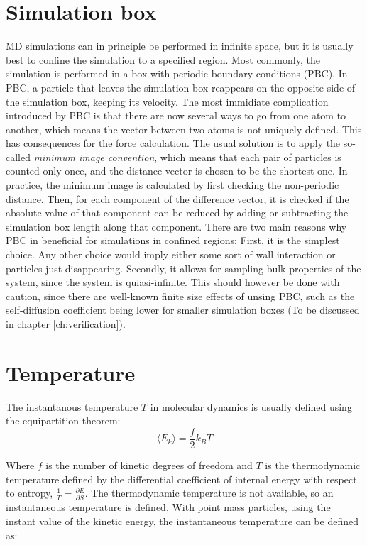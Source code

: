 \section{Simulation box}
MD simulations can in principle be performed in infinite space, but it is usually best to confine the simulation to a specified region. Most commonly, the simulation is performed in a box with periodic boundary conditions (PBC). In PBC, a particle that leaves the simulation box reappears on the opposite side of the simulation box, keeping its velocity. The most immidiate complication introduced by PBC is that there are now several ways to go from one atom to another, which means the vector between two atoms is not uniquely defined. This has consequences for the force calculation. The usual solution is to apply the so-called \emph{minimum image convention}, which means that each pair of particles is counted only once, and the distance vector is chosen to be the shortest one. In practice, the minimum image is calculated by first checking the non-periodic distance. Then, for each component of the difference vector, it is checked if the absolute value of that component can be reduced by adding or subtracting the simulation box length along that component.
There are two main reasons why PBC in beneficial for simulations in confined regions: First, it is the simplest choice. Any other choice would imply either some sort of wall interaction or particles just disappearing. Secondly, it allows for sampling bulk properties of the system, since the system is quiasi-infinite. This should however be done with caution, since there are well-known finite size effects of unsing PBC, such as the self-diffusion coefficient being lower for smaller simulation boxes (To be discussed in chapter \ref{ch:verification}).

\section{Temperature}
The instantanous temperature $T$ in molecular dynamics is usually defined using the equipartition theorem:
\begin{equation}
	\langle E_k \rangle = \frac{f}{2}k_B T
\end{equation}

Where $f$ is the number of kinetic degrees of freedom and $T$ is the thermodynamic temperature defined by the differential coefficient of internal energy with respect to entropy, $\frac{1}{T} = \frac{\partial E}{\partial S}$. The thermodynamic temperature is not available, so an instantaneous temperature is defined. With point mass particles, using the instant value of the kinetic energy, the instantaneous temperature can be defined as:


